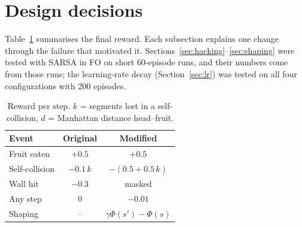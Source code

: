 \documentclass{article}
\begin{document}
\section{Design decisions}
\label{sec:design}

Table~\ref{tab:reward} summarises the final reward. Each subsection explains one change through the failure that motivated it. Sections~\ref{sec:hacking}--\ref{sec:shaping} were tested with SARSA in FO on short 60-episode runs, and their numbers come from those runs; the learning-rate decay (Section~\ref{sec:lr}) was tested on all four configurations with 200 episodes.

\begin{table}[t]
\caption{Reward per step. $k$ = segments lost in a self-collision, $d$ = Manhattan distance head--fruit.}
\label{tab:reward}
\vskip 0.1in
\begin{center}
\begin{small}
\begin{tabular}{lcc}
\toprule
Event & Original & Modified \\
\midrule
Fruit eaten        & $+0.5$      & $+0.5$ \\
Self-collision     & $-0.1\,k$   & $-(0.5+0.5\,k)$ \\
Wall hit           & $-0.3$      & masked \\
Any step           & $0$         & $-0.01$ \\
Shaping            & --          & $\gamma\Phi(s')-\Phi(s)$ \\
\bottomrule
\end{tabular}
\end{small}
\end{center}
\vskip -0.15in
\end{table}
\end{document}
